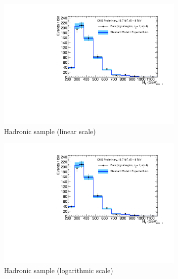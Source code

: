 \clearpage
\begin{figure}[h!]
  \centering
  \begin{subfigure}[b]{0.48\textwidth}
    \includegraphics[width=\textwidth,page=1]
    {Figs/results/v0/blueBand/bestFit_2012dev_RQcdZero_fZinvAll_1b_ge4j-12hp_smOnly}
    \caption{Hadronic sample (linear scale)}
  \end{subfigure}
  \begin{subfigure}[b]{0.48\textwidth}
    \includegraphics[width=\textwidth,page=2]
    {Figs/results/v0/blueBand/bestFit_2012dev_RQcdZero_fZinvAll_1b_ge4j-12hp_smOnly}
    \caption{Hadronic sample (logarithmic scale)}
  \end{subfigure}
  \begin{subfigure}[b]{0.48\textwidth}

\end{subfigure}
\end{figure}
